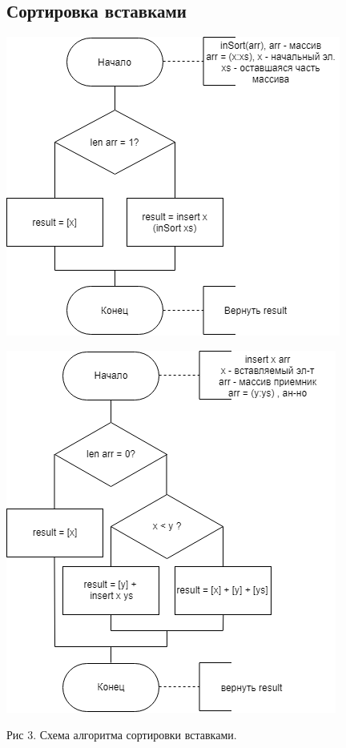 \documentclass[12pt]{report}
\begin{document}
\subsection{Сортировка вставками}

\begin{center}
	\includegraphics[scale=0.6]{inSort1.png}
	
	
	\includegraphics[scale=0.6]{inSort2.png}
	
	Рис 3. Схема алгоритма сортировки вставками.
\end{center}
\end{document}
